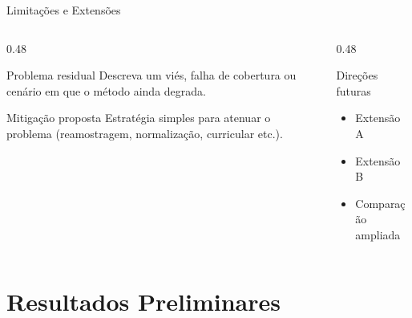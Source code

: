 \documentclass[aspectratio=169, 10pt, brazil]{beamer}
\begin{document}
\begin{frame}{Limitações e Extensões}
  \begin{columns}[T]
    \begin{column}{0.48\textwidth}
      \begin{alerta}{Problema residual}
        Descreva um viés, falha de cobertura ou cenário
        em que o método ainda degrada.
      \end{alerta}
      \vspace{0.5em}
      \begin{destaque}{Mitigação proposta}
        Estratégia simples para atenuar o problema
        (reamostragem, normalização, curricular etc.).
      \end{destaque}
    \end{column}
    \begin{column}{0.48\textwidth}
      \begin{block}{Direções futuras}
        \begin{itemize}
          \item Extensão A
          \item Extensão B
          \item Comparação ampliada
        \end{itemize}
      \end{block}
    \end{column}
  \end{columns}
\end{frame}

\section{Resultados Preliminares}
\end{document}

